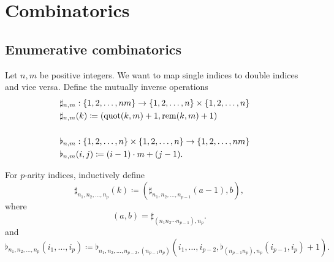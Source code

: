 \section{Combinatorics}\label{sec:combinatorics}
\subsection{Enumerative combinatorics}\label{subsec:enumerative_combinatorics}

\begin{definition}\label{def:double_index_maps}
  Let \( n, m \) be positive integers. We want to map single indices to double indices and vice versa. Define the mutually inverse operations
  \begin{align*}
    &\sharp_{n,m}: \{ 1, 2, \ldots, nm \} \to \{ 1, 2, \ldots, n \} \times \{ 1, 2, \ldots, n \} \\
    &\sharp_{n,m}(k) \coloneqq (\operatorname{quot}(k, m) + 1, \operatorname{rem}(k, m) + 1)
    &\\
    &\\
    &\flat_{n,m}: \{ 1, 2, \ldots, n \} \times \{ 1, 2, \ldots, n \} \to \{ 1, 2, \ldots, nm \} \\
    &\flat_{n,m}(i, j) \coloneqq (i - 1) \cdot m + (j - 1).
  \end{align*}

  For \( p \)-arity indices, inductively define
  \begin{equation*}
    \sharp_{n_1, n_2, \ldots, n_p}(k) \coloneqq (\sharp_{n_1, n_2, \ldots, n_{p-1}}(a - 1), b),
  \end{equation*}
  where
  \begin{equation*}
    (a, b) = \sharp_{(n_1 n_2 \cdots n_{p-1}), n_p}.
  \end{equation*}
  and
  \begin{equation*}
    \flat_{n_1, n_2, \ldots, n_p}(i_1, \ldots, i_p) \coloneqq \flat_{n_1, n_2, \ldots, n_{p-2}, (n_{p-1} n_p)}(i_1, \ldots, i_{p-2}, \flat_{(n_{p-1} n_p), n_p}(i_{p-1}, i_p) + 1).
  \end{equation*}
\end{definition}
